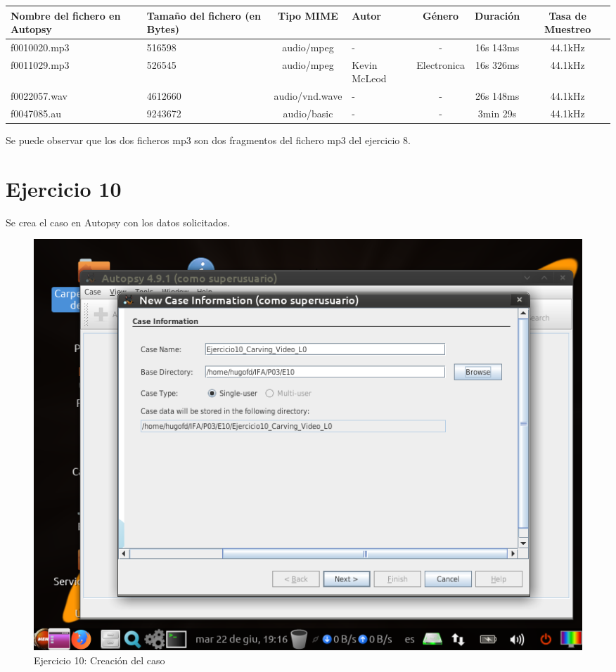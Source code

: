 \documentclass[11pt]{article}
\begin{document}
\begin{table}[H]
    \centering
    \begin{tabular}{|p{2.5cm}|p{2cm}|c|p{1.5cm}|c|c|c|}
        \hline
        Nombre del fichero en Autopsy & Tamaño del fichero (en Bytes) & Tipo MIME & Autor & Género & Duración & Tasa de Muestreo \\
        \hline\hline
        f0010020.mp3 & 516598 & audio/mpeg & - & - & 16s 143ms & 44.1kHz \\
        \hline
        f0011029.mp3 & 526545 & audio/mpeg & Kevin McLeod & Electronica & 16s 326ms & 44.1kHz \\
        \hline
        f0022057.wav & 4612660 & audio/vnd.wave & - & - & 26s 148ms & 44.1kHz \\
        \hline
        f0047085.au & 9243672 & audio/basic & - & - & 3min 29s & 44.1kHz \\
        \hline
    \end{tabular}
\end{table}

Se puede observar que los dos ficheros mp3 son dos fragmentos del fichero mp3 del ejercicio 8.

\section{Ejercicio 10}
Se crea el caso en Autopsy con los datos solicitados.

\begin{figure}[H]
    \caption{Ejercicio 10: Creación del caso}
    \centering
    \includegraphics[scale=0.7]{e10-1.png}
\end{figure}
\end{document}
